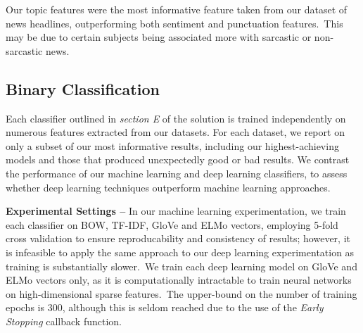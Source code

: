 \documentclass[12pt,a4paper]{article}
\begin{document}
\noindent Our topic features were the most informative feature taken from our dataset of news headlines, outperforming both sentiment and punctuation features.\ This may be due to certain subjects being associated more with sarcastic or non-sarcastic news.



\subsection{Binary Classification}\vspace{-5pt}
\noindent Each classifier outlined in \textit{section E} of the solution is trained independently on numerous features extracted from our datasets. For each dataset, we report on only a subset of our most informative results, including our highest-achieving models and those that produced unexpectedly good or bad results. We contrast the performance of our machine learning and deep learning classifiers, to assess whether deep learning techniques outperform machine learning approaches.\\\vspace{-4pt}


\noindent \textbf{Experimental Settings --} In our machine learning experimentation, we train each classifier on BOW, TF-IDF, GloVe and ELMo vectors, employing 5-fold cross validation to ensure reproducability and consistency of results; however, it is infeasible to apply the same approach to our deep learning experimentation as training is substantially slower.\ We train each deep learning model on GloVe and ELMo vectors only, as it is computationally intractable to train neural networks on high-dimensional sparse features.\ The upper-bound on the number of training epochs is 300, although this is seldom reached due to the use of the \textit{Early Stopping} callback function.\\\vspace{-10pt}

\\\vspace{-10pt}
\end{document}
